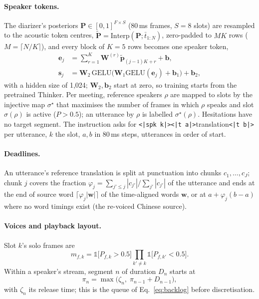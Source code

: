 \paragraph{Speaker tokens.} The diarizer's posteriors $\bm{P}\in[0,1]^{F\times S}$ (80\,ms frames, $S=8$ slots) are
resampled to the acoustic token centres, $\tilde{\bm{P}}=\mathrm{Interp}(\bm{P};\bar{t}_{1:N})$, zero-padded to $MK$
rows ($M=\lceil N/K\rceil$), and every block of $K=5$ rows becomes one speaker token,
\begin{equation}
\begin{aligned}
\bm{e}_j&=\textstyle\sum_{r=1}^{K}\bm{W}^{(r)}\tilde{\bm{p}}_{(j-1)K+r}+\bm{b},\\
\bm{s}_j&=\bm{W}_2\,\mathrm{GELU}\big(\bm{W}_1\mathrm{GELU}(\bm{e}_j)+\bm{b}_1\big)+\bm{b}_2,
\end{aligned}
\label{eq:conv}
\end{equation}
with a hidden size of 1{,}024; $\bm{W}_2,\bm{b}_2$ start at zero, so training starts from the pretrained Thinker.
Per meeting, reference speakers $\rho$ are mapped to slots by the injective map $\sigma^\star$ that maximises the
number of frames in which $\rho$ speaks and slot $\sigma(\rho)$ is active ($P>0.5$); an utterance by $\rho$ is
labelled $\sigma^\star(\rho)$. Hesitations have no target segment. The instruction asks for
\texttt{<|spk k|><|t a|>}translation\texttt{<|t b|>} per utterance, $k$ the slot, $a,b$ in 80\,ms steps, utterances
in order of start.

\paragraph{Deadlines.} An utterance's reference translation is split at punctuation into chunks $c_1,\dots,c_J$; chunk
$j$ covers the fraction $\varphi_j=\sum_{j'\le j}|c_{j'}|/\sum_{j'}|c_{j'}|$ of the utterance and ends at the end of
source word $\lceil\varphi_j|\bm{w}|\rceil$ of the time-aligned words $\bm{w}$, or at $a+\varphi_j(b-a)$ where no
word timings exist (the re-voiced Chinese source).

\paragraph{Voices and playback layout.} Slot $k$'s solo frames are
\begin{equation}
m_{f,k}=\mathds{1}\big[P_{f,k}>0.5\big]\textstyle\prod_{k'\neq k}\mathds{1}\big[P_{f,k'}<0.5\big].
\label{eq:alone}
\end{equation}
Within a speaker's stream, segment $n$ of duration $D_n$ starts at
\begin{equation}
\pi_n=\max\big(\zeta_n,\;\pi_{n-1}+D_{n-1}\big),
\label{eq:layout}
\end{equation}
with $\zeta_n$ its release time; this is the queue of Eq.~\eqref{eq:backlog} before discretisation.

